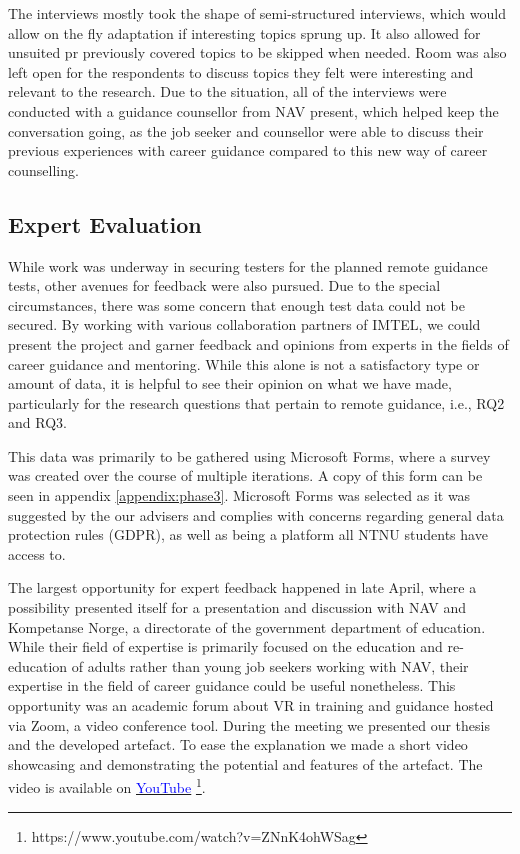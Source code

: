 The interviews mostly took the shape of semi-structured interviews, which would allow on the fly adaptation if interesting topics sprung up. It also allowed for unsuited pr previously covered topics to be skipped when needed. Room was also left open for the respondents to discuss topics they felt were interesting and relevant to the research. Due to the situation, all of the interviews were conducted with a guidance counsellor from NAV present, which helped keep the conversation going, as the job seeker and counsellor were able to discuss their previous experiences with career guidance compared to this new way of career counselling.

\subsection{Expert Evaluation}
\label{section:phase3_expertEval}
While work was underway in securing testers for the planned remote guidance tests, other avenues for feedback were also pursued. Due to the special circumstances, there was some concern that enough test data could not be secured. By working with various collaboration partners of IMTEL, we could present the project and garner feedback and opinions from experts in the fields of career guidance and mentoring. While this alone is not a satisfactory type or amount of data, it is helpful to see their opinion on what we have made, particularly for the research questions that pertain to remote guidance, i.e., RQ2 and RQ3.

This data was primarily to be gathered using Microsoft Forms, where a survey was created over the course of multiple iterations. A copy of this form can be seen in appendix \ref{appendix:phase3}. Microsoft Forms was selected as it was suggested by the our advisers and complies with concerns regarding general data protection rules (GDPR), as well as being a platform all NTNU students have access to.

The largest opportunity for expert feedback happened in late April, where a possibility presented itself for a presentation and discussion with NAV and Kompetanse Norge, a directorate of the government department of education. While their field of expertise is primarily focused on the education and re-education of adults rather than young job seekers working with NAV, their expertise in the field of career guidance could be useful nonetheless.
This opportunity was an academic forum about VR in training and guidance hosted via Zoom, a video conference tool. During the meeting we presented our thesis and the developed artefact. To ease the explanation we made a short video showcasing and demonstrating the potential and features of the artefact. The video is available on  \href{https://www.youtube.com/watch?v=ZNnK4ohWSag}{\textcolor{blue}{YouTube}} \footnote{https://www.youtube.com/watch?v=ZNnK4ohWSag}. 

